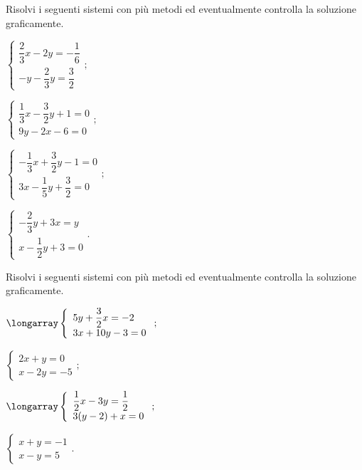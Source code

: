 \begin{esercizio}[\Ast]
 \label{ese:19.72}
 Risolvi i seguenti sistemi con più metodi ed eventualmente controlla
la soluzione graficamente.
\begin{multicols}{2}
\begin{enumeratea}
{\longarray
\item $\left\{\begin{array}{l}\dfrac{2}{3}x-2y=-{\dfrac{1}{6}}\\-y-\dfrac{2}{3}y=\dfrac{3}{2} \end{array}\right.;$
\item $\left\{\begin{array}{l}\dfrac{1}{3}x-\dfrac{3}{2}y+1=0\\9y-2x-6=0 \end{array}\right.;$
\item $\left\{\begin{array}{l}-{\dfrac{1}{3}}x+\dfrac{3}{2}y-1=0\\3x-\dfrac{1}{5}y+\dfrac{3}{2}=0 \end{array}\right.;$
\item $\left\{\begin{array}{l}-{\dfrac{2}{3}}y+3x=y\\x-\dfrac{1}{2}y+3=0 \end{array}\right..$}
\end{enumeratea}
\end{multicols}
\end{esercizio}
\pagebreak
\begin{esercizio}[\Ast]
 \label{ese:19.73}
 Risolvi i seguenti sistemi con più metodi ed eventualmente controlla
la soluzione graficamente.
\begin{multicols}{2}
\begin{enumeratea}
\item $\longarray\left\{\begin{array}{l}5y+\dfrac{3}{2}x=-2\\3x+10y-3=0 \end{array}\right.;$
\item $\left\{\begin{array}{l}{2x+y=0}\\{x-2y=-5}\end{array}\right.;$
\item $\longarray\left\{\begin{array}{l}\dfrac{1}{2}x-3y=\dfrac{1}{2}\\3(y-2)+x=0 \end{array}\right.;$
\item $\left\{\begin{array}{l}{x+y=-1}\\{x-y=5}\end{array}\right..$
\end{enumeratea}
\end{multicols}
\end{esercizio}

